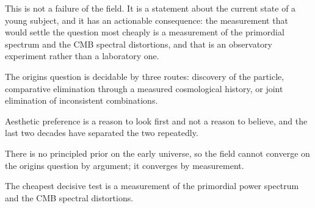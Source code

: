 This is not a failure of the field. It is a statement about the current
state of a young subject, and it has an actionable consequence: the
measurement that would settle the question most cheaply is a measurement of
the primordial spectrum and the CMB spectral distortions, and that is an
observatory experiment rather than a laboratory one.

\begin{keytakeaways}
\item The origins question is decidable by three routes: discovery of the
particle, comparative elimination through a measured cosmological history,
or joint elimination of inconsistent combinations.
\item Aesthetic preference is a reason to look first and not a reason to
believe, and the last two decades have separated the two repeatedly.
\item There is no principled prior on the early universe, so the field cannot
converge on the origins question by argument; it converges by measurement.
\item The cheapest decisive test is a measurement of the primordial power
spectrum and the CMB spectral distortions.
\end{keytakeaways}
